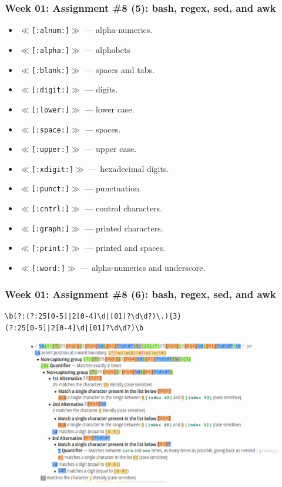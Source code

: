 \documentclass[xcolor=table, notheorems, hyperref={pdfpagelabels=false}]{beamer}
\begin{document}
\begin{frame}[fragile]
\frametitle{Week 01: Assignment \#8 (5): bash, regex, sed, and awk}
\begin{itemize}
\item $\ll$\texttt{[:alnum:]}$\gg$ --- alpha-numerics.
\item $\ll$\texttt{[:alpha:]}$\gg$ --- alphabets
\item $\ll$\texttt{[:blank:]}$\gg$ --- spaces and tabs.
\item $\ll$\texttt{[:digit:]}$\gg$ --- digits.
\item $\ll$\texttt{[:lower:]}$\gg$ --- lower case.
\item $\ll$\texttt{[:space:]}$\gg$ --- spaces.
\item $\ll$\texttt{[:upper:]}$\gg$ --- upper case.
\item $\ll$\texttt{[:xdigit:]}$\gg$ --- hexadecimal digits.
\item $\ll$\texttt{[:punct:]}$\gg$ --- punctuation.
\item $\ll$\texttt{[:cntrl:]}$\gg$ --- control characters.
\item $\ll$\texttt{[:graph:]}$\gg$ --- printed characters.
\item $\ll$\texttt{[:print:]}$\gg$ --- printed and spaces.
\item $\ll$\texttt{[:word:]}$\gg$ --- alpha-numerics and underscore.
\end{itemize}
\end{frame}

\begin{frame}[fragile]
\frametitle{Week 01: Assignment \#8 (6): bash, regex, sed, and awk}

\begin{verbatim}
\b(?:(?:25[0-5]|2[0-4]\d|[01]?\d\d?)\.){3}
(?:25[0-5]|2[0-4]\d|[01]?\d\d?)\b
\end{verbatim}

\begin{figure}
\includegraphics[width=0.96\linewidth]{os-regex1}
\end{figure}
\end{frame}
\end{document}
